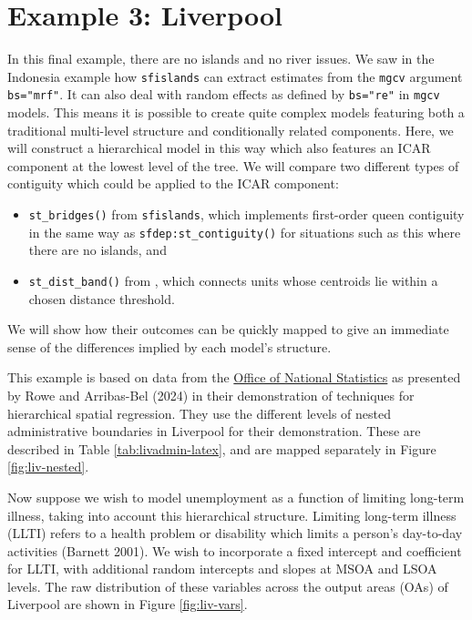 \hypertarget{example-3-liverpool}{%
\section{Example 3: Liverpool}\label{example-3-liverpool}}

In this final example, there are no islands and no river issues. We saw in the Indonesia example how \texttt{sfislands} can extract estimates from the \texttt{mgcv} argument \texttt{bs="mrf"}. It can also deal with random effects as defined by \texttt{bs="re"} in \texttt{mgcv} models. This means it is possible to create quite complex models featuring both a traditional multi-level structure and conditionally related components. Here, we will construct a hierarchical model in this way which also features an ICAR component at the lowest level of the tree. We will compare two different types of contiguity which could be applied to the ICAR component:

\begin{itemize}
\tightlist
\item
  \texttt{st\_bridges()} from \texttt{sfislands}, which implements first-order queen contiguity in the same way as \texttt{sfdep:st\_contiguity()} for situations such as this where there are no islands, and
\item
  \texttt{st\_dist\_band()} from , which connects units whose centroids lie within a chosen distance threshold.
\end{itemize}

We will show how their outcomes can be quickly mapped to give an immediate sense of the differences implied by each model's structure.

This example is based on data from the \href{https://www.nomisweb.co.uk/home/census2001.asp}{Office of National Statistics} as presented by Rowe and Arribas-Bel (2024) in their demonstration of techniques for hierarchical spatial regression. They use the different levels of nested administrative boundaries in Liverpool for their demonstration. These are described in Table \ref{tab:livadmin-latex}, and are mapped separately in Figure \ref{fig:liv-nested}.

Now suppose we wish to model unemployment as a function of limiting long-term illness, taking into account this hierarchical structure. Limiting long-term illness (LLTI) refers to a health problem or disability which limits a person's day-to-day activities (Barnett 2001). We wish to incorporate a fixed intercept and coefficient for LLTI, with additional random intercepts and slopes at MSOA and LSOA levels. The raw distribution of these variables across the output areas (OAs) of Liverpool are shown in Figure
\ref{fig:liv-vars}.

